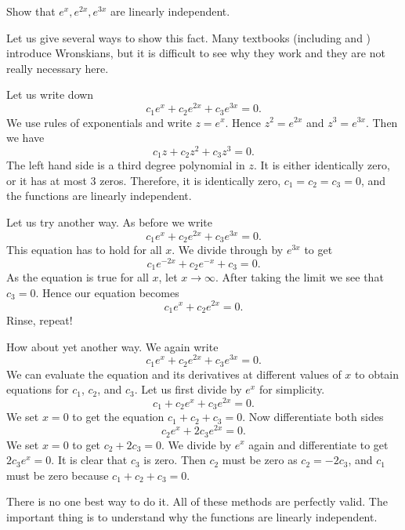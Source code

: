 \begin{example}
Show that $e^x, e^{2x}, e^{3x}$ are linearly independent.

Let us give several ways to show this fact.
Many textbooks (including \cite{EP} and
\cite{F}) introduce Wronskians, but it is difficult to see why they work and
they are not really necessary here.

Let us write down
\begin{equation*}
c_1 e^x + c_2 e^{2x} + c_3 e^{3x} = 0.
\end{equation*}
We use rules of exponentials and write $z = e^x$.  Hence $z^2 = e^{2x}$
and $z^3 = e^{3x}$.  Then we have
\begin{equation*}
c_1 z + c_2 z^2 + c_3 z^3 = 0.
\end{equation*}
The left hand side is a third degree polynomial in $z$.
It is either identically zero,
or it has at most 3 zeros.  Therefore, it is identically zero,
$c_1 = c_2 = c_3 = 0$, and the functions are linearly independent.

Let us try another way.  As before we write
\begin{equation*}
c_1 e^x + c_2 e^{2x} + c_3 e^{3x} = 0.
\end{equation*}
This equation has to hold for all $x$.  We divide through
by $e^{3x}$ to get
\begin{equation*}
c_1 e^{-2x} + c_2 e^{-x} + c_3 = 0.
\end{equation*}
As the equation is true for all $x$, let $x \to \infty$.  After taking the
limit we see that $c_3 = 0$.  Hence our equation becomes
\begin{equation*}
c_1 e^x + c_2 e^{2x} = 0.
\end{equation*}
Rinse, repeat!

How about yet another way.  We again write
\begin{equation*}
c_1 e^x + c_2 e^{2x} + c_3 e^{3x} = 0.
\end{equation*}
We can evaluate the equation and its derivatives at different
values of $x$ to obtain equations for
$c_1$, $c_2$, and $c_3$.
Let us first
divide by $e^{x}$ for simplicity.
\begin{equation*}
c_1 + c_2 e^{x} + c_3 e^{2x} = 0.
\end{equation*}
We set $x=0$ to get the equation $c_1 + c_2 + c_3 = 0$.  Now differentiate
both sides
\begin{equation*}
c_2 e^{x} + 2 c_3 e^{2x} = 0 .
\end{equation*}
We set $x=0$ to get $c_2 + 2c_3 = 0$.  We divide by $e^x$ again and
differentiate to get
$2 c_3 e^{x} = 0$.  It is clear that $c_3$ is zero.  Then $c_2$ must be
zero as $c_2 = -2c_3$, and $c_1$ must be zero because $c_1 + c_2 + c_3 = 0$.

There is no one best way to do it.  All of these methods are perfectly valid.
The important thing is to understand why the functions are linearly
independent.
\end{example}

